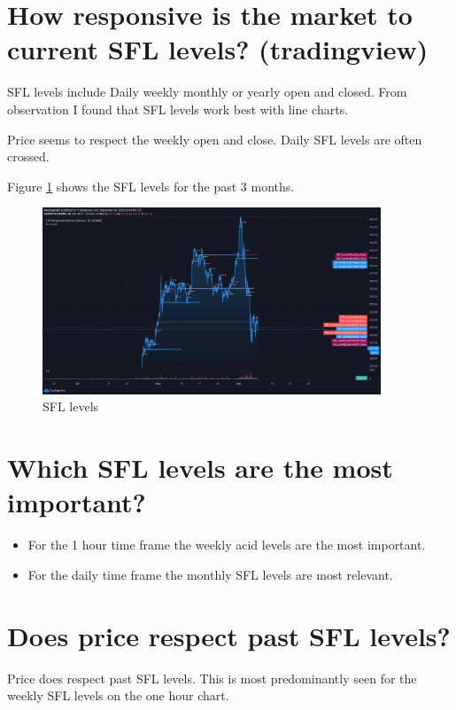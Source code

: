 \section{ How responsive is the market to current SFL levels? (tradingview)}
SFL levels include Daily weekly monthly or yearly open and closed. From observation I found that SFL levels work best with line charts. 

Price seems to respect the weekly open and close. Daily SFL levels are often crossed.

Figure \ref{fig:sfl} shows the SFL levels for the past 3 months.

\begin{figure}[H]
\center
\includegraphics[width=0.9\textwidth]{fig/sfl.png}
\caption{SFL levels}
\label{fig:sfl}
\end{figure}

\section{ Which SFL levels are the most important? }
\begin{itemize}

\item For the 1 hour time frame the weekly acid levels are the most important.
\item For the daily time frame the monthly SFL levels are most relevant.

\end{itemize}

\section{ Does price respect past SFL levels?}
Price does respect past SFL levels.  This is most predominantly seen for the weekly SFL levels on the one hour chart. 